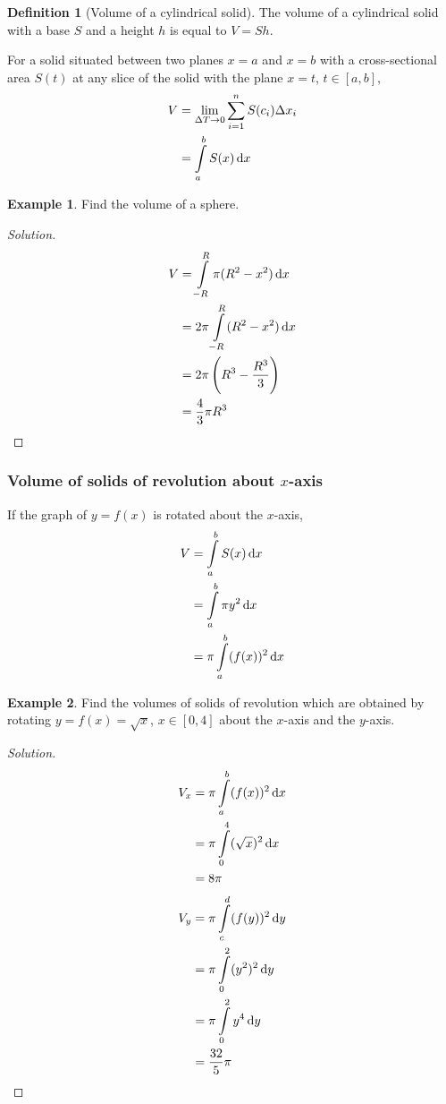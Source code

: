 \documentclass[fleqn, a4paper, 12pt]{article}
\theoremstyle{definition}
\newtheorem{example}{Example}
\newtheorem{definition}{Definition}
\theoremstyle{theorem}
\theoremstyle{remark}
\newenvironment{solution}
{\begin{proof}[Solution]\let\qed\relax}
	{\end{proof}}
\begin{document}
\begin{definition}[Volume of a cylindrical solid]
	The volume of a cylindrical solid with a base $S$ and a height $h$ is equal to $V = S h$.
\end{definition}

For a solid situated between two planes $x = a$ and $x = b$ with a cross-sectional area $S(t)$ at any slice of the solid with the plane $x = t$, $t \in [a, b]$, 
\begin{align*}
	V &= \lim\limits_{\Delta T \to 0} \sum_{i = 1}^{n} S(c_i) \Delta x_i\\
	&= \int\limits_{a}^{b} S(x) \dif x
\end{align*}

\begin{example}
	Find the volume of a sphere.
\end{example}

\begin{solution}
	\begin{align*}
		V &= \int\limits_{-R}^{R} \pi (R^2 - x^2) \dif x\\
		&= 2 \pi \int\limits_{-R}^{R} (R^2 - x^2) \dif x\\
		&= 2 \pi \left( R^3 - \dfrac{R^3}{3} \right)\\
		&= \dfrac{4}{3} \pi R^3
	\end{align*}
\end{solution}

\subsubsection{Volume of solids of revolution about $x$-axis}

If the graph of $y = f(x)$ is rotated about the $x$-axis,
\begin{align*}
	V &= \int\limits_{a}^{b} S(x) \dif x\\
	&= \int\limits_{a}^{b} \pi y^2 \dif x\\
	&= \pi \int\limits_{a}^{b} (f(x))^2 \dif x
\end{align*}

\begin{example}
	Find the volumes of solids of revolution which are obtained by rotating $y = f(x) = \sqrt{x}$, $x \in [0,4]$ about the $x$-axis and the $y$-axis.
\end{example}

\begin{solution}
	\begin{align*}
		V_x &= \pi \int\limits_{a}^{b} (f(x))^2 \dif x\\
		&= \pi \int\limits_{0}^{4} (\sqrt{x})^2 \dif x\\
		&= 8 \pi
	\end{align*}
	\begin{align*}
		V_y &= \pi \int\limits_{c}^{d} (f(y))^2 \dif y\\
		&= \pi \int\limits_{0}^{2} (y^2)^2 \dif y\\
		&= \pi \int\limits_{0}^{2} y^4 \dif y\\
		&= \dfrac{32}{5} \pi
	\end{align*}
\end{solution}
\end{document}

